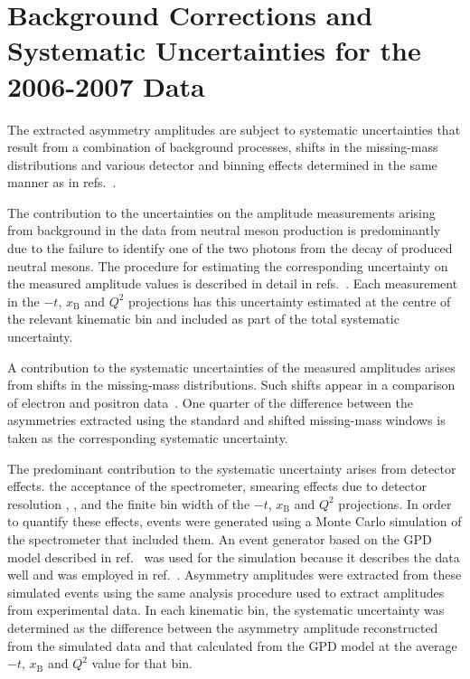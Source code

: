 \section{Background Corrections and Systematic Uncertainties for the
  2006-2007 Data}
The extracted asymmetry amplitudes are subject to systematic uncertainties that
result from a combination of background processes, 
shifts in the missing-mass distributions and various detector and binning
effects determined in the same manner as in refs.~\cite{Air08,Air09}.

The contribution to the uncertainties on the amplitude measurements
arising from background in the data from neutral meson
production is predominantly due to the failure to identify one of
  the two photons from the decay of produced neutral mesons. The procedure for estimating the corresponding
uncertainty on the measured amplitude values is described in detail in
refs.~\cite{Air08,Air09}. Each measurement in the $-t$, $x_{\textrm{B}}$ and
  $Q^{2}$ projections has this uncertainty estimated at the
  centre of the relevant kinematic bin and included as part of the
  total systematic uncertainty.

A contribution to the systematic uncertainties of the
  measured amplitudes arises from shifts in  the
missing-mass distributions. Such shifts appear in a comparison of electron and positron data~\cite{Zei09,Bur10}. One
quarter of the difference between the asymmetries extracted using the standard
and shifted missing-mass windows is taken as the corresponding systematic
uncertainty. 

The predominant contribution to the systematic uncertainty arises from detector
effects.  the acceptance of the spectrometer, smearing
effects due to detector resolution , , and the finite bin width of the $-t$, $x_{\textrm{B}}$ and $Q^{2}$ projections. In order to quantify these effects, events were generated using a Monte Carlo simulation of the spectrometer that included them. An event generator based on the GPD model described in ref.~\cite{Van99,Goe01} was
used for the simulation because it describes the data well and was employed in ref.~\cite{Air09}. Asymmetry amplitudes were extracted
from these simulated events using the same analysis procedure used to
extract amplitudes from experimental data. In each kinematic bin, the
systematic uncertainty was determined as the difference between the asymmetry amplitude reconstructed from the simulated data and that
calculated from the GPD model at the average $-t$, $x_{\textrm{B}}$ and
$Q^{2}$ value for that bin.

